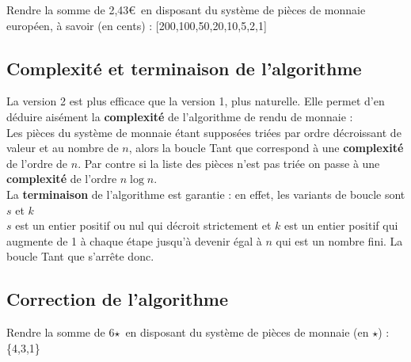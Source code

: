 \documentclass[12pt,french]{article}
\begin{document}
\small
\begin{tcolorbox}[enhanced,attach boxed title to top center={yshift=-3mm,yshifttext=-1mm},
	colback=green!5!white,colframe=green!75!black,colbacktitle=green!25!black,
	title=Exemple 2, fonttitle=\bfseries,
	boxed title style={size=small,colframe=green!25!black} ]
	Rendre la somme de 2,43\euro\, en disposant du système de pièces de monnaie européen, à savoir (en cents) : [200,100,50,20,10,5,2,1]
\end{tcolorbox}
\normalsize
\subsection{Complexité et terminaison de l'algorithme}
La version 2 est plus efficace que la version 1, plus naturelle. Elle permet d'en déduire aisément la \textbf{complexité} de l'algorithme de rendu de monnaie :\\
Les pièces du système de monnaie étant supposées triées par ordre décroissant de valeur et au nombre de $n$, alors la boucle Tant que correspond à une \textbf{complexité} de l'ordre de $n$.
Par contre si la liste des pièces n'est pas triée on passe à une \textbf{complexité} de l'ordre $n \log n$.\\ 
La \textbf{terminaison} de l'algorithme est garantie : en effet, les variants de boucle sont $s$ et $k$ \\
$s$ est un entier positif ou nul qui décroit strictement et $k$ est un entier positif qui augmente de 1 à chaque étape jusqu'à devenir égal à $n$ qui est un nombre fini. La boucle Tant que s'arrête donc.

\subsection{Correction de l'algorithme}
\small
\begin{tcolorbox}[enhanced,attach boxed title to top center={yshift=-3mm,yshifttext=-1mm},
	colback=green!5!white,colframe=green!75!black,colbacktitle=green!25!black,
	title=Exemple 3, fonttitle=\bfseries,
	boxed title style={size=small,colframe=green!25!black} ]
	Rendre la somme de 6$\star$\, en disposant du système de pièces de monnaie (en $\star$) : \{4,3,1\}
\end{tcolorbox}
\end{document}
